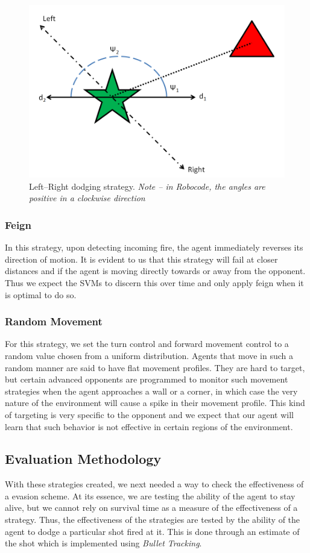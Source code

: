 \documentclass{article}
\theoremstyle{plain}
\theoremstyle{definition}
\theoremstyle{remark}
\begin{document}
\begin{figure}[h]
	\centering
		\includegraphics[width=7 cm]{LR}
	\caption{Left--Right dodging strategy. \emph{Note -- in Robocode, the angles are positive in a clockwise direction}}
	\label{LR}
\end{figure}

\subsubsection*{Feign}
In this strategy, upon detecting incoming fire, the agent immediately reverses its direction of motion.
It is evident to us that this strategy will fail at closer distances and if the agent is moving directly towards or away from the opponent. Thus we expect the SVMs to discern this over time and only apply feign when it is optimal to do so.

\subsubsection*{Random Movement}
For this strategy, we set the turn control and forward movement control to a random value chosen from a uniform distribution. Agents that move in such a random manner are said to have flat movement profiles. They are hard to target, but certain advanced opponents are programmed to monitor such movement strategies when the agent approaches a wall or a corner, in which case the very nature of the environment will cause a spike in their movement profile. This kind of targeting is very specific to the opponent and we expect that our agent will learn that such behavior is not effective in certain regions of the environment.

\subsection*{Evaluation Methodology}
With these strategies created, we next needed a way to check the effectiveness of a evasion scheme. At its essence, we are testing the ability of the agent to stay alive, but we cannot rely on survival time as a measure of the effectiveness of a strategy. Thus, the effectiveness of the strategies are tested by the ability of the agent to dodge a particular shot fired at it. This is done through an estimate of the shot which is implemented using \emph{Bullet Tracking}.
\end{document}
